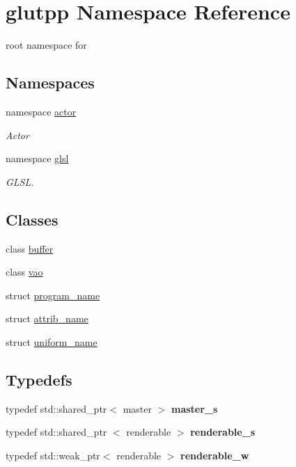 \hypertarget{namespaceglutpp}{\section{glutpp \-Namespace \-Reference}
\label{namespaceglutpp}
}


root namespace for   


\subsection*{\-Namespaces}
\begin{DoxyCompactItemize}
\item 
namespace \hyperlink{namespaceglutpp_1_1actor}{actor}
\begin{DoxyCompactList}\small\item\em \-Actor \end{DoxyCompactList}\item 
namespace \hyperlink{namespaceglutpp_1_1glsl}{glsl}
\begin{DoxyCompactList}\small\item\em \-G\-L\-S\-L. \end{DoxyCompactList}\end{DoxyCompactItemize}
\subsection*{\-Classes}
\begin{DoxyCompactItemize}
\item 
class \hyperlink{classglutpp_1_1buffer}{buffer}
\item 
class \hyperlink{classglutpp_1_1vao}{vao}
\item 
struct \hyperlink{structglutpp_1_1program__name}{program\-\_\-name}
\item 
struct \hyperlink{structglutpp_1_1attrib__name}{attrib\-\_\-name}
\item 
struct \hyperlink{structglutpp_1_1uniform__name}{uniform\-\_\-name}
\end{DoxyCompactItemize}
\subsection*{\-Typedefs}
\begin{DoxyCompactItemize}
\item 
\hypertarget{namespaceglutpp_ad416fff92cdabdc3141618680ccd1945}{typedef std\-::shared\-\_\-ptr$<$ master $>$ {\bfseries master\-\_\-s}}\label{namespaceglutpp_ad416fff92cdabdc3141618680ccd1945}

\item 
\hypertarget{namespaceglutpp_a67ccde707354c95f87efe65589d3219d}{typedef std\-::shared\-\_\-ptr\*
$<$ renderable $>$ {\bfseries renderable\-\_\-s}}\label{namespaceglutpp_a67ccde707354c95f87efe65589d3219d}

\item 
\hypertarget{namespaceglutpp_ab992d93431ecb78e57041c940827dd90}{typedef std\-::weak\-\_\-ptr$<$ renderable $>$ {\bfseries renderable\-\_\-w}}\label{namespaceglutpp_ab992d93431ecb78e57041c940827dd90}

\end{DoxyCompactItemize}
